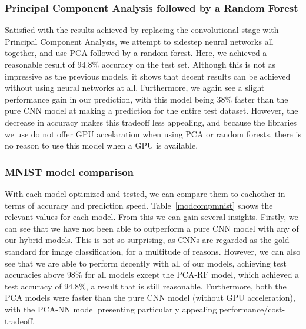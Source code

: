 \documentclass[onecolumn,10pt,cleanfoot]{asme2ej}
\begin{document}
\subsubsection{Principal Component Analysis followed by a Random Forest}

Satisfied with the results achieved by replacing the convolutional stage with Principal Component Analysis, we attempt to sidestep neural networks all together, and use PCA followed by a random forest. Here, we achieved a reasonable result of $94.8\%$ accuracy on the test set. Although this is not as impressive as the previous models, it shows that decent results can be achieved without using neural networks at all. Furthermore, we again see a slight performance gain in our prediction, with this model being $38\%$ faster than the pure CNN model at making a prediction for the entire test dataset. However, the decrease in accuracy makes this tradeoff less appealing, and because the libraries we use do not offer GPU accelaration when using PCA or random forests, there is no reason to use this model when a GPU is available.

\subsubsection{MNIST model comparison}

With each model optimized and tested, we can compare them to eachother in terms of accuracy and prediction speed. Table~\ref{modcompmnist} shows the relevant values for each model. From this we can gain several insights. Firstly, we can see that we have not been able to outperform a pure CNN model with any of our hybrid models. This is not so surprising, as CNNs are regarded as the gold standard for image classification, for a multitude of reasons. However, we can also see that we are able to perform decently with all of our models, achieving test accuracies above $98\%$ for all models except the PCA-RF model, which achieved a test accuracy of $94.8\%$, a result that is still reasonable. Furthermore, both the PCA models were faster than the pure CNN model (without GPU acceleration), with the PCA-NN model presenting particularly appealing performance/cost-tradeoff.
\end{document}
